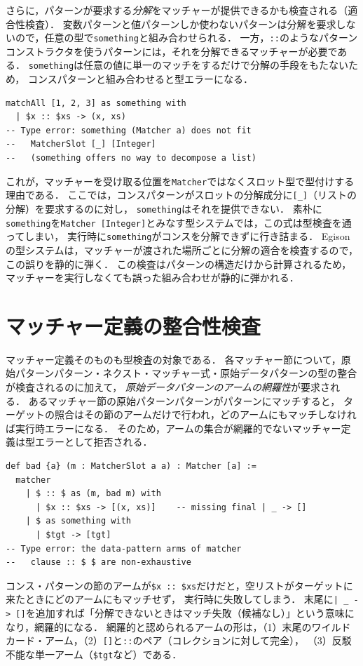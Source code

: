 さらに，パターンが要求する\emph{分解}をマッチャーが提供できるかも検査される（適合性検査）．
変数パターンと値パターンしか使わないパターンは分解を要求しないので，任意の型で\lstinline{something}と組み合わせられる．
一方，\lstinline{::}のようなパターンコンストラクタを使うパターンには，それを分解できるマッチャーが必要である．
\lstinline{something}は任意の値に単一のマッチをするだけで分解の手段をもたないため，
コンスパターンと組み合わせると型エラーになる．
\begin{lstlisting}[language=egison,numbers=none]
matchAll [1, 2, 3] as something with
  | $x :: $xs -> (x, xs)
-- Type error: something (Matcher a) does not fit
--   MatcherSlot [_] [Integer]
--   (something offers no way to decompose a list)
\end{lstlisting}
これが，マッチャーを受け取る位置を\lstinline{Matcher}ではなくスロット型で型付けする理由である．
ここでは，コンスパターンがスロットの分解成分に\lstinline{[_]}（リストの分解）を要求するのに対し，
\lstinline{something}はそれを提供できない．
素朴に\lstinline{something}を\lstinline{Matcher [Integer]}とみなす型システムでは，この式は型検査を通ってしまい，
実行時に\lstinline{something}がコンスを分解できずに行き詰まる．
Egisonの型システムは，マッチャーが渡された場所ごとに分解の適合を検査するので，この誤りを静的に弾く．
この検査はパターンの構造だけから計算されるため，マッチャーを実行しなくても誤った組み合わせが静的に弾かれる．

\section{マッチャー定義の整合性検査}\label{matcher-consistency}

マッチャー定義そのものも型検査の対象である．
各マッチャー節について，原始パターンパターン・ネクスト・マッチャー式・原始データパターンの型の整合が検査されるのに加えて，
\emph{原始データパターンのアームの網羅性}が要求される．
あるマッチャー節の原始パターンパターンがパターンにマッチすると，
ターゲットの照合はその節のアームだけで行われ，どのアームにもマッチしなければ実行時エラーになる．
そのため，アームの集合が網羅的でないマッチャー定義は型エラーとして拒否される．
\begin{lstlisting}[language=egison]
def bad {a} (m : MatcherSlot a a) : Matcher [a] :=
  matcher
    | $ :: $ as (m, bad m) with
      | $x :: $xs -> [(x, xs)]    -- missing final | _ -> []
    | $ as something with
      | $tgt -> [tgt]
-- Type error: the data-pattern arms of matcher
--   clause :: $ $ are non-exhaustive
\end{lstlisting}
コンス・パターンの節のアームが\lstinline{$x :: $xs}だけだと，空リストがターゲットに来たときにどのアームにもマッチせず，
実行時に失敗してしまう．
末尾に\lstinline{| _ -> []}を追加すれば「分解できないときはマッチ失敗（候補なし）」という意味になり，網羅的になる．
網羅的と認められるアームの形は，（1）末尾のワイルドカード・アーム，（2）\lstinline{[]}と\lstinline{::}のペア（コレクションに対して完全），
（3）反駁不能な単一アーム（\lstinline{$tgt}など）である．

